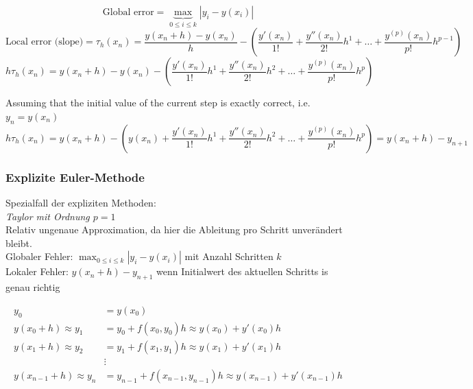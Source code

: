 $$
\text{Global error} = \underbrace{\max}_{0 \leq i \leq k} |y_i - y(x_i)|
$$
$$
\text{Local error (slope)} = \tau_h(x_n) = \frac{y(x_n +h)- y(x_n)}{h} - \left( \frac{y'(x_n)}{1!} + \frac{y''(x_n)}{2!}h^1 + \dots + \frac{y^{(p)} (x_n)}{p!} h^{p-1} \right)
$$
$$
 h \tau_h(x_n) = y(x_n +h)- y(x_n) - \left( \frac{y'(x_n)}{1!}h^1 + \frac{y''(x_n)}{2!}h^2 + \dots + \frac{y^{(p)} (x_n)}{p!} h^{p} \right)
$$

Assuming that the initial value of the current step is exactly correct, i.e. $y_n = y(x_n)$
$$
h \tau_h(x_n) = y(x_n +h) - \left(y(x_n) + \frac{y'(x_n)}{1!}h^1 + \frac{y''(x_n)}{2!}h^2 + \dots + \frac{y^{(p)} (x_n)}{p!} h^{p} \right) = y(x_n + h)-y_{n+1}
$$






    \begin{minipage}{7cm}
      \subsubsection{Explizite Euler-Methode}
        Spezialfall der expliziten Methoden: \\
        \emph{Taylor mit Ordnung $p=1$} \\
        Relativ ungenaue Approximation,
        da hier die Ableitung pro Schritt unverändert bleibt.  \\

        Globaler Fehler: $\max_{0 \leq i \leq k} |y_i - y(x_i)|$ mit Anzahl Schritten $k$\\
        Lokaler Fehler: $y(x_n+h) - y_{n+1}$ wenn Initialwert des aktuellen Schritts is genau richtig
    \end{minipage}
    \hspace{8mm}
    \begin{minipage}{12cm}
        \begin{align*}
            y_0 &= y(x_0) \\
            y(x_0+h) \approx y_1 &= y_0 + f(x_0,y_0) h \approx y(x_0) + y'(x_0)h \\
            y(x_1+h) \approx y_2 &= y_1 + f(x_1,y_1)h \approx y(x_1) + y'(x_1)h \\
            & \vdots \\
            y(x_{n-1}+h) \approx y_n &= y_{n-1} + f(x_{n-1},y_{n-1})h \approx y(x_{n-1}) + y'(x_{n-1})h
        \end{align*}
    \end{minipage}

